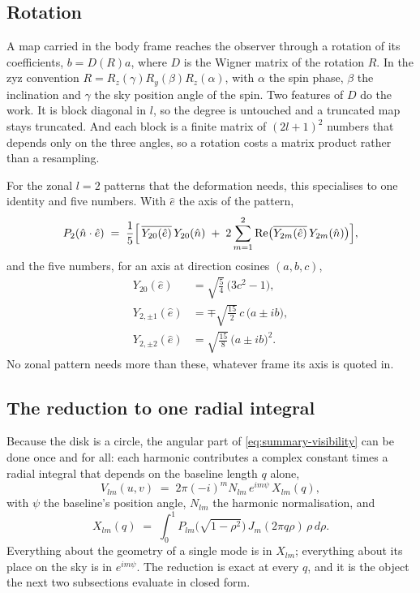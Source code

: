 \subsection{Rotation}

A map carried in the body frame reaches the observer through a rotation of its coefficients,
$b = D(R)a$, where $D$ is the Wigner matrix of the rotation $R$.  In the zyz convention
$R = R_z(\gamma)R_y(\beta)R_z(\alpha)$, with $\alpha$ the spin phase, $\beta$ the inclination
and $\gamma$ the sky position angle of the spin.  Two features of $D$ do the work.  It is
block diagonal in $l$, so the degree is untouched and a truncated map stays truncated.  And
each block is a finite matrix of $(2l+1)^2$ numbers that depends only on the three angles,
so a rotation costs a matrix product rather than a resampling.

For the zonal $l = 2$ patterns that the deformation needs, this specialises to one identity
and five numbers.  With $\hat e$ the axis of the pattern,
\begin{equation}
  P_2(\hat n\cdot\hat e) \;=\; \frac{1}{5}\Bigl[\, \overline{Y_{20}(\hat e)}\,Y_{20}(\hat n)
  \;+\; 2\sum_{m=1}^{2}\mathrm{Re}\bigl(\overline{Y_{2m}(\hat e)}\,Y_{2m}(\hat n)\bigr)\Bigr] ,
  \label{eq:summary-zonal}
\end{equation}
and the five numbers, for an axis at direction cosines $(a,b,c)$,
\begin{equation}
  \begin{aligned}
    Y_{20}(\hat e) &= \sqrt{\tfrac54}\,\bigl(3c^2-1\bigr), \\
    Y_{2,\pm1}(\hat e) &= \mp\sqrt{\tfrac{15}{2}}\,c\,\bigl(a\pm ib\bigr), \\
    Y_{2,\pm2}(\hat e) &= \sqrt{\tfrac{15}{8}}\,\bigl(a\pm ib\bigr)^2 .
  \end{aligned}
  \label{eq:summary-five-numbers}
\end{equation}
No zonal pattern needs more than these, whatever frame its axis is quoted in.

\subsection{The reduction to one radial integral}

Because the disk is a circle, the angular part of \eqref{eq:summary-visibility} can be done
once and for all: each harmonic contributes a complex constant times a radial integral that
depends on the baseline length $q$ alone,
\begin{equation}
  V_{lm}(u,v) \;=\; 2\pi(-i)^m N_{lm}\, e^{im\psi}\, X_{lm}(q) ,
  \label{eq:summary-mode}
\end{equation}
with $\psi$ the baseline's position angle, $N_{lm}$ the harmonic normalisation, and
\begin{equation}
  X_{lm}(q) \;=\; \int_0^1 P_{lm}\bigl(\sqrt{1-\rho^2}\bigr)\, J_m(2\pi q\rho)\,
  \rho\, d\rho .
  \label{eq:summary-radial-integral}
\end{equation}
Everything about the geometry of a single mode is in $X_{lm}$; everything about its place on
the sky is in $e^{im\psi}$.  The reduction is exact at every $q$, and it is the object the
next two subsections evaluate in closed form.

